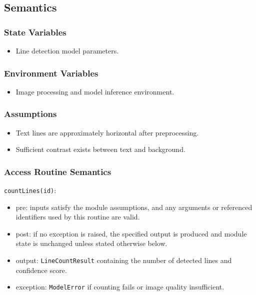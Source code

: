 \documentclass[12pt, titlepage]{article}
\begin{document}
\subsection{Semantics}

\subsubsection{State Variables}
\begin{itemize}
    \item Line detection model parameters.
\end{itemize}

\subsubsection{Environment Variables}
\begin{itemize}
    \item Image processing and model inference environment.
\end{itemize}

\subsubsection{Assumptions}
\begin{itemize}
    \item Text lines are approximately horizontal after preprocessing.
    \item Sufficient contrast exists between text and background.
\end{itemize}

\subsubsection{Access Routine Semantics}

\noindent \texttt{countLines(id)}:
\begin{itemize}
    \item pre: inputs satisfy the module assumptions, and any arguments or referenced identifiers used by this routine are valid.
    \item post: if no exception is raised, the specified output is produced and module state is unchanged unless stated otherwise below.
    \item output: \texttt{LineCountResult} containing the number of detected lines and confidence score.
    \item exception: \texttt{ModelError} if counting fails or image quality insufficient.
\end{itemize}
\end{document}
